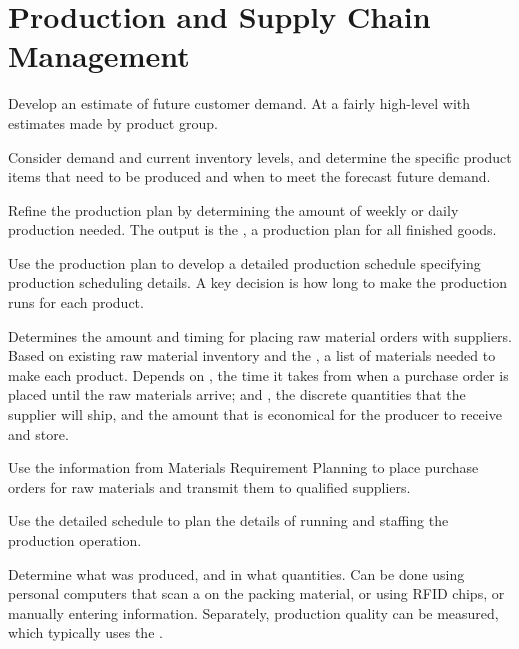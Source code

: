\documentclass[\main/notes.tex]{subfiles}
\begin{document}
		\section{Production and Supply Chain Management}
			\begin{description}[nosep]
				\item[1. Sales forecasting] Develop an estimate of future customer demand. At a fairly high-level with estimates made by product group.
				\item[2. Sales and Operations Plan] Consider demand and current inventory levels, and determine the specific product items that need to be produced and when to meet the forecast future demand.
				\item[3. Demand Management] Refine the production plan by determining the amount of weekly or daily production needed. The output is the , a production plan for all finished goods.
				\item[4. Detailed Scheduling] Use the production plan to develop a detailed production schedule specifying production scheduling details. A key decision is how long to make the production runs for each product.
				\item[5. Materials Requirement Planning] Determines the amount and timing for placing raw material orders with suppliers. Based on existing raw material inventory and the , a list of materials needed to make each product. Depends on , the time it takes from when a purchase order is placed until the raw materials arrive; and , the discrete quantities that the supplier will ship, and the amount that is economical for the producer to receive and store.
				\item[6. Purchasing] Use the information from Materials Requirement Planning to place purchase orders for raw materials and transmit them to qualified suppliers.
				\item[7. Production] Use the detailed schedule to plan the details of running and staffing the production operation.
				\item[8. Capture information about production] Determine what was produced, and in what quantities. Can be done using personal computers that scan a  on the packing material, or using RFID chips, or manually entering information. Separately, production quality can be measured, which typically uses the .
			\end{description}
\end{document}
